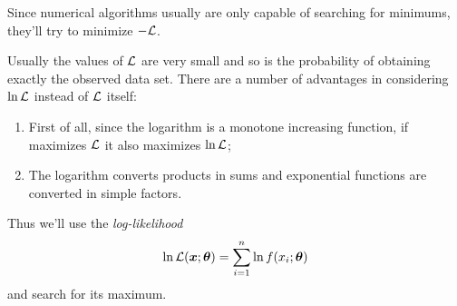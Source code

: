 Since numerical algorithms usually are only capable of searching for minimums, they'll try to minimize $-\mathcal{L}$.


{\color{red}
	Usually the values of $\mathcal{L}$ are very small and so is the probability of obtaining exactly the observed data set.
}
There are a number of advantages in considering $\ln\mathcal{L}$ instead of $\mathcal{L}$ itself:
\begin{enumerate}
	\item
		First of all, since the logarithm is a monotone increasing function, if \vec{\hat\theta} maximizes $\mathcal{L}$ it also maximizes $\ln\mathcal{L}$;
	\item
		The logarithm converts products in sums and exponential functions are converted in simple factors.
\end{enumerate}
Thus we'll use the \emph{log-likelihood}
\begin{equation}
	\ln \mathcal{L}(\bm{{x}};\bm{{\theta}}) = \sum_{i=1}^n \ln f(x_i;\bm{{\theta}})
\end{equation}
and search for its maximum.

